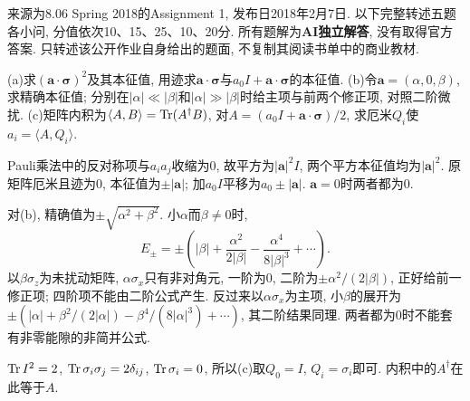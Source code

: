 来源为8.06 Spring 2018的Assignment 1, 发布日2018年2月7日. 以下完整转述五题各小问, 分值依次10、15、25、10、20分. 所有题解为\textbf{AI独立解答}, 没有取得官方答案. 只转述该公开作业自身给出的题面, 不复制其阅读书单中的商业教材.

\begin{exercise}
(a)求$(\boldsymbol a\cdot\boldsymbol\sigma)^2$及其本征值, 用迹求$\boldsymbol a\cdot\boldsymbol\sigma$与$a_0I+\boldsymbol a\cdot\boldsymbol\sigma$的本征值. (b)令$\boldsymbol a=(\alpha,0,\beta)$, 求精确本征值; 分别在$|\alpha|\ll|\beta|$和$|\alpha|\gg|\beta|$时给主项与前两个修正项, 对照二阶微扰. (c)矩阵内积为$\langle A,B\rangle=\operatorname{Tr}(A^\dagger B)$, 对$A=(a_0I+\boldsymbol a\cdot\boldsymbol\sigma)/2$, 求厄米$Q_i$使$a_i=\langle A,Q_i\rangle$.
\end{exercise}
\begin{solution}
Pauli乘法中的反对称项与$a_ia_j$收缩为0, 故平方为$|\boldsymbol a|^2I$, 两个平方本征值均为$|\boldsymbol a|^2$. 原矩阵厄米且迹为0, 本征值为$\pm|\boldsymbol a|$; 加$a_0I$平移为$a_0\pm|\boldsymbol a|$. $\boldsymbol a=0$时两者都为0.

对(b), 精确值为$\pm\sqrt{\alpha^2+\beta^2}$. 小$\alpha$而$\beta\neq0$时,
\[
E_\pm=\pm\left(|\beta|+\frac{\alpha^2}{2|\beta|}-\frac{\alpha^4}{8|\beta|^3}+\cdots\right).
\]
以$\beta\sigma_z$为未扰动矩阵, $\alpha\sigma_x$只有非对角元, 一阶为0, 二阶为$\pm\alpha^2/(2|\beta|)$, 正好给前一修正项; 四阶项不能由二阶公式产生. 反过来以$\alpha\sigma_x$为主项, 小$\beta$的展开为$\pm(|\alpha|+\beta^2/(2|\alpha|)-\beta^4/(8|\alpha|^3)+\cdots)$, 其二阶结果同理. 两者都为0时不能套有非零能隙的非简并公式.

$\operatorname{Tr} I^2=2$, $\operatorname{Tr}\sigma_i\sigma_j=2\delta_{ij}$, $\operatorname{Tr}\sigma_i=0$, 所以(c)取$Q_0=I$, $Q_i=\sigma_i$即可. 内积中的$A^\dagger$在此等于$A$.
\end{solution}

